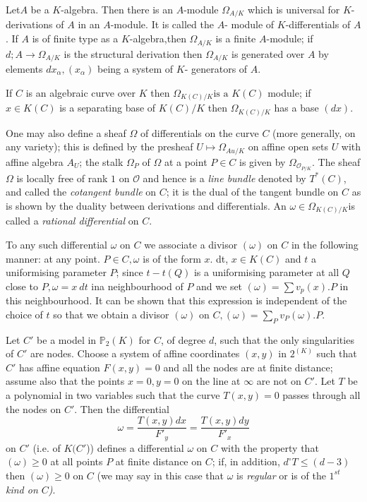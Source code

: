 Let\pageoriginale $A$ be a $K$-algebra. Then there is an $A$-module $\Omega
_{A/K}$ which is universal for $K$-derivations of $A$ in an
$A$-module. It is called the $A$- module of $K$-differentials  of
$A$. If $A$ is of finite type as a $K$-algebra,then $\Omega _{A/K}$ is
a finite $A$-module;  if $d; A \rightarrow \Omega _{A/K}$ is the
structural derivation then   $\Omega _{A/K}$ is generated over $A$ by
elements $   dx_\alpha, (x_\alpha)$ being a system of $K$- generators
of $A$. 

If $C$ is an algebraic curve over $K$  then $ \Omega_{K(C)/K} \text{
  is a } K(C)$  module; if  $x\in K(C)$ is a separating base of
$K(C)/K$ then $\Omega_{K(C)/K}$ has a base $(dx)$. 

One may also define a sheaf $\Omega$ of differentials on the curve $C$
(more generally, on any variety); this is defined by the presheaf $U
\longmapsto  \Omega_{A u/K}  $ on affine open sets $U$ with affine
algebra $A_U$; the stalk $\Omega_P$ of $\Omega$ at a point $ P \in
C$ is given by $\Omega _{\mathscr{O}_{P/K}}$.  The sheaf $\Omega$ is
locally free of rank $1$ on $\mathscr{O}$  and hence is a \textit{
  line bundle } denoted by $T^*(C)$, and called  the \textit{
  cotangent bundle} on $C$; it is the dual of the tangent bundle on
$C$ as is shown by the duality between  derivations and
differentials. An $  \omega \in \Omega _{K(C)/K}$is called a \textit{
  rational differential} on $C$. 

To any such differential $\omega$  on $C$ we associate a divisor
$(\omega)$ on $C$ in the following manner: at any point. $ P \in C,
\omega$  is of  the form $x$. dt, $x \in K(C)$   and $t$ a
uniformising parameter $P$; since $t-t(Q)$ is a uniformising parameter
at all $Q$ close to $P, \omega= x~ dt$ in\pageoriginale a neighbourhood of  
$P$ and we set $(\omega)= \sum  v_p  (x).P$ in this neighbourhood. It can be
shown that this expression is independent of the choice of $t$ so that
we obtain a divisor $(\omega)$ on $C,(\omega) =  \sum \limits _P v_P
(\omega).P$. 

\setcounter{proposition}{0}
\begin{proposition}\label{chap2:sec2:prop1} %
  Let $C'$ be a model in $\mathbb{P}_2 (K)$ for $C$, of degree $d$,
  such that the only singularities of $C'$ are nodes. Choose a  system
  of affine coordinates $(x,y)$ in $ 2^{(K)}$  such that $C'$ has
  affine equation $F(x,y) =0$ and all the nodes are at finite
  distance; assume also that  the points $x=0,y=0$ on the line at
  $\infty$ are not on $C'$. Let $T$ be a polynomial in two  variables
  such  that the  curve $T(x,y)=0$ passes through all the nodes on
  $C'$. Then the differential  
  $$ 
  \omega= \frac{T (x,y)dx} {F'_y}= \frac{T(x,y)dy} {F'_x}
  $$
  on $C'$ (i.e. of $K(C'$)) defines a differential $\omega$ on $C$
  with the property that $(\omega)  \geq 0$ at all points $P$ at
  finite distance on $C$; if, in addition, $  d^\circ T \leq (d-3)$
  then $(\omega) \geq 0 $ on $C$ (we may say in this case that
  $\omega$ is \textit{ regular } or is of the\textit{ $1^{st}$ kind on
    $C$)}. 
\end{proposition}

